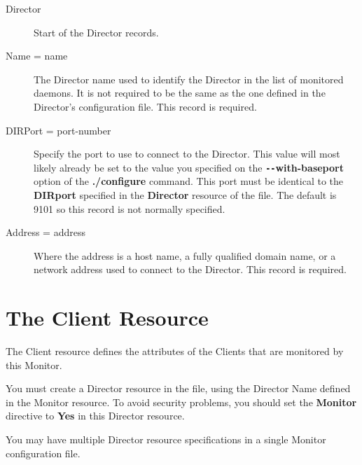 \begin{description}

\item [Director]
   Start of the Director records. 

\item [Name = \lt{}name\gt{}]
   The Director name used to identify  the Director in the list of monitored
daemons. It is not required  to be the same as the one defined in the Director's
configuration file.  This record is required. 

\item [DIRPort = \lt{}port-number\gt{}]
   Specify the port to use to connect  to the Director. This value will most
likely already be set to the value  you specified on the {\bf
\verb:--:with-baseport} option of the  {\bf ./configure} command. This port must be
identical to the  {\bf DIRport} specified in the {\bf Director} resource of
the 
 file.  The
default is 9101 so this record is not normally specified. 

\item [Address = \lt{}address\gt{}]
   Where the address is a host name,  a fully qualified domain name, or a network
address used to connect  to the Director.  This record is required. 
\end{description}

\section{The Client Resource}
\label{ClientResource1}

The Client resource defines the attributes of the Clients that are monitored
by this Monitor.

You must create a Director resource in the 
 file, using the
Director Name defined in the Monitor resource. To avoid security problems, you
should set the {\bf Monitor} directive to {\bf Yes} in this Director resource.


You may have multiple Director resource specifications in a single Monitor
configuration file. 

